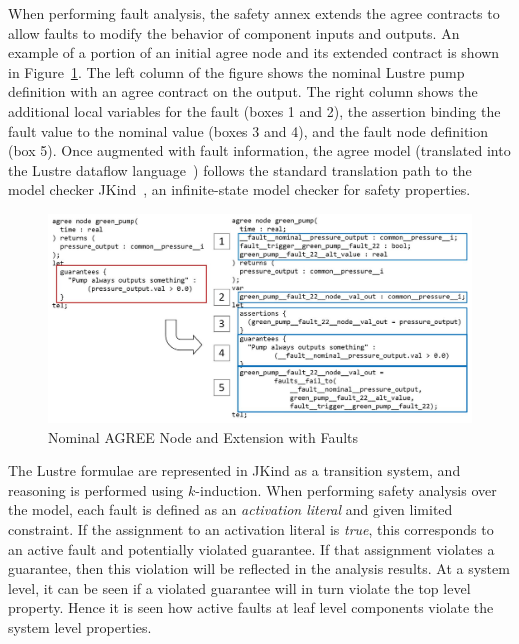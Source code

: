 When performing fault analysis, the safety annex extends the \gls{agree} contracts to allow faults to modify the behavior of component inputs and outputs. An example of a portion of an initial \gls{agree} node and its extended contract is shown in Figure~\ref{fig:lustre}. The left column of the figure shows the nominal Lustre pump definition with an \gls{agree} contract on the output. The right column shows the additional local variables for the fault (boxes 1 and 2), the assertion binding the fault value to the nominal value (boxes 3 and 4), and the fault node definition (box 5). Once augmented with fault information, the \gls{agree} model (translated into the Lustre dataflow language~\cite{Halbwachs91:IEEE}) follows the standard translation path to the model checker JKind~\cite{2017arXiv171201222G}, an infinite-state model checker for safety properties. 

\begin{figure}[h!]
	\begin{centering}
		\includegraphics[width=\textwidth]{images/lustre.jpg}
		\caption{Nominal AGREE Node and Extension with Faults}
		\label{fig:lustre}
	\end{centering}
\end{figure}

The Lustre formulae are represented in JKind as a transition system, and reasoning is performed using $k$-induction. When performing safety analysis over the model, each fault is defined as an {\em activation literal} and given limited constraint. If the assignment to an activation literal is {\em true}, this corresponds to an active fault and potentially violated guarantee. If that assignment violates a guarantee, then this violation will be reflected in the analysis results. At a system level, it can be seen if a violated guarantee will in turn violate the top level property. Hence it is seen how active faults at leaf level components violate the system level properties. 
 
